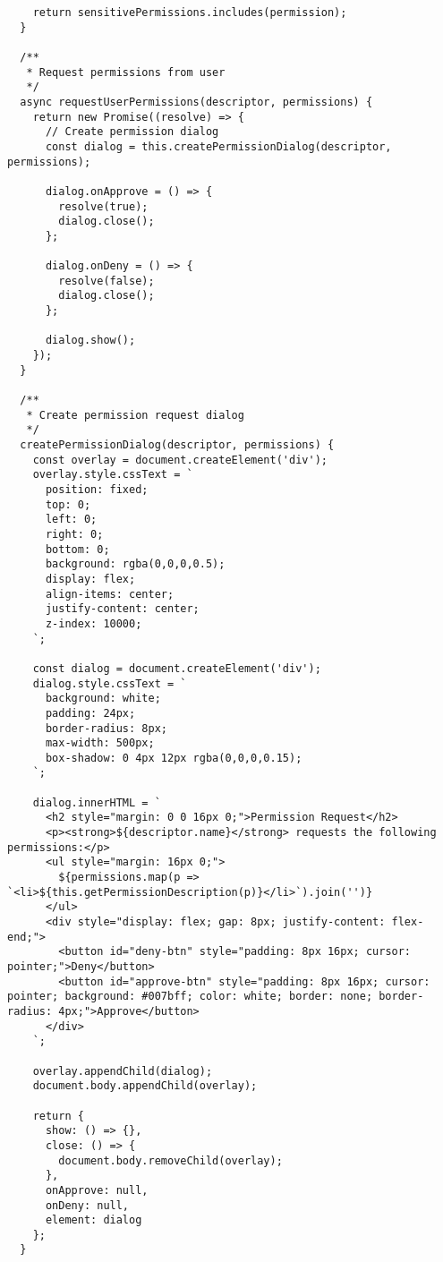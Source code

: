 \documentclass[11pt]{article}
\begin{document}
\begin{verbatim}
    return sensitivePermissions.includes(permission);
  }
  
  /**
   * Request permissions from user
   */
  async requestUserPermissions(descriptor, permissions) {
    return new Promise((resolve) => {
      // Create permission dialog
      const dialog = this.createPermissionDialog(descriptor, permissions);
      
      dialog.onApprove = () => {
        resolve(true);
        dialog.close();
      };
      
      dialog.onDeny = () => {
        resolve(false);
        dialog.close();
      };
      
      dialog.show();
    });
  }
  
  /**
   * Create permission request dialog
   */
  createPermissionDialog(descriptor, permissions) {
    const overlay = document.createElement('div');
    overlay.style.cssText = `
      position: fixed;
      top: 0;
      left: 0;
      right: 0;
      bottom: 0;
      background: rgba(0,0,0,0.5);
      display: flex;
      align-items: center;
      justify-content: center;
      z-index: 10000;
    `;
    
    const dialog = document.createElement('div');
    dialog.style.cssText = `
      background: white;
      padding: 24px;
      border-radius: 8px;
      max-width: 500px;
      box-shadow: 0 4px 12px rgba(0,0,0,0.15);
    `;
    
    dialog.innerHTML = `
      <h2 style="margin: 0 0 16px 0;">Permission Request</h2>
      <p><strong>${descriptor.name}</strong> requests the following permissions:</p>
      <ul style="margin: 16px 0;">
        ${permissions.map(p => `<li>${this.getPermissionDescription(p)}</li>`).join('')}
      </ul>
      <div style="display: flex; gap: 8px; justify-content: flex-end;">
        <button id="deny-btn" style="padding: 8px 16px; cursor: pointer;">Deny</button>
        <button id="approve-btn" style="padding: 8px 16px; cursor: pointer; background: #007bff; color: white; border: none; border-radius: 4px;">Approve</button>
      </div>
    `;
    
    overlay.appendChild(dialog);
    document.body.appendChild(overlay);
    
    return {
      show: () => {},
      close: () => {
        document.body.removeChild(overlay);
      },
      onApprove: null,
      onDeny: null,
      element: dialog
    };
  }
  

\end{verbatim}
\end{document}
